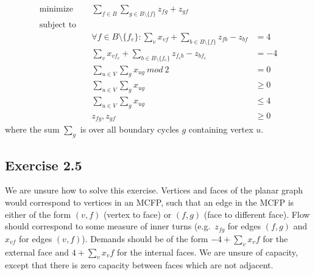 \begin{align*}
  \text{minimize} \quad & \sum_{f\in B} \sum_{g\in B\setminus\{f\}} z_{fg} + z_{gf} &  \\
  \text{subject to} \quad & & \\
  & \forall f \in B\setminus \{f_e\} : \sum_{v} x_{vf} + \sum_{b\in B\setminus \{f\}} z_{fb} - z_{bf} &= 4 \\
  & \sum_{v} x_{v f_e} + \sum_{b\in B\setminus \{f_e\}} z_{f_e b} - z_{b f_e} &= -4 \\
  & \sum_{u\in V} \sum_{g} x_{ug} \ \textit{mod} \ 2 & = 0 \\
  & \sum_{u\in V} \sum_{g} x_{ug} & \geq 0 \\
  & \sum_{u\in V} \sum_{g} x_{ug} & \leq 4 \\
  & z_{fg}, z_{gf} & \geq 0
\end{align*} 
%
where the sum $\sum_{g}$ is over all boundary cycles $g$ containing vertex $u$.
%
\subsection{Exercise 2.5}
%
We are unsure how to solve this exercise. Vertices and faces of the planar graph
would correspond to vertices in an MCFP, such that an edge in the MCFP is either 
of the form $(v,f)$ (vertex to face) or $(f,g)$ (face to different face). Flow should 
correspond to some measure of inner turns (e.g.\ $z_{fg}$ for edges $(f,g)$ and $x_{vf}$ 
for edges $(v,f)$). Demands should be of the form
$-4+\sum_{v} x_vf$ for the external face and $4+\sum_{v} x_vf$ for the internal faces.
We are unsure of capacity, except that there is zero capacity between faces which are not
adjacent.
